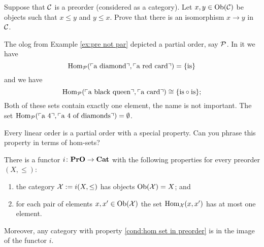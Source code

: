 \documentclass[CT4S-EN-RU]{subfiles}
\begin{document}
\begin{exerciseRUS}
\end{exerciseRUS}

\begin{exerciseENG}
Suppose that $\mathcal{C}$ is a preorder (considered as a category). Let $x,y\in\textnormal{Ob}(\mathcal{C})$ be objects such that $x\leq y$ and $y\leq x$. Prove that there is an isomorphism $x\to y$ in $\mathcal{C}$.
\end{exerciseENG}

\begin{exerciseRUS}
\end{exerciseRUS}

\begin{exampleENG}
The olog from Example \ref{ex:pre not par} depicted a partial order, say $\mathcal{P}$. In it we have $$\textnormal{Hom}_\mathcal{P}(\textnormal{$\ulcorner$a diamond$\urcorner$},\textnormal{$\ulcorner$a red card$\urcorner$})=\{\textnormal{is}\}$$ and we have $$\textnormal{Hom}_\mathcal{P}(\textnormal{$\ulcorner$a black queen$\urcorner$},\textnormal{$\ulcorner$a card$\urcorner$})\cong\{\textnormal{is}\circ\textnormal{is}\};$$ Both of these sets contain exactly one element, the name is not important. The set $\textnormal{Hom}_\mathcal{P}(\textnormal{$\ulcorner$a 4$\urcorner$},\textnormal{$\ulcorner$a 4 of diamonds$\urcorner$})=\emptyset$. 
\end{exampleENG}

\begin{exampleRUS}
\end{exampleRUS}

\begin{exerciseENG}
Every linear order is a partial order with a special property. Can you phrase this property in terms of hom-sets?
\end{exerciseENG}

\begin{exerciseRUS}
\end{exerciseRUS}

\begin{propositionENG}\label{prop:preorders to cats}
There is a functor $i\colon{\mathbf{PrO}}\rightarrow{\mathbf{Cat}}$ with the following properties for every preorder $(X,\leq)$:
\begin{enumerate}
\item the category $\mathcal{X}:=i(X,\leq)$ has objects $\textnormal{Ob}(\mathcal{X})=X$; and
\item \label{cond:hom set in preorder} for each pair of elements $x,x'\in\textnormal{Ob}(\mathcal{X})$ the set $\textnormal{Hom}_\mathcal{X}(x,x')$ has at most one element.
\end{enumerate}
Moreover, any category with property \ref{cond:hom set in preorder} is in the image of the functor $i$.
\end{propositionENG}
\end{document}
